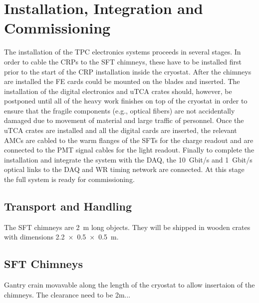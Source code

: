 
\section{Installation, Integration and Commissioning}
\label{sec:fddp-tpc-elec-install}

The installation of the TPC electronics systems proceeds in several stages. In order to cable the CRPs to the SFT chimneys, these have to be installed first prior to the start of the CRP installation inside the cryostat. After the chimneys are installed the FE cards could be mounted on the blades and inserted. The installation of the digital electronics and uTCA crates should, however, be postponed until all of the heavy work finishes on top of the cryostat in order to ensure that the fragile components (e.g., optical fibers) are not accidentally damaged due to movement of material and large traffic of personnel. Once the uTCA crates are installed and all the digital cards are inserted, the relevant AMCs are cabled to the warm flanges of the SFTs for the charge readout and are connected to the PMT signal cables for the light readout. Finally to complete the installation and integrate the system with the DAQ, the \SI{10}{Gbit/s} and \SI{1}{Gbit/s} optical links to the DAQ and WR timing network are connected. At this stage the full system is ready for commissioning. 

\subsection{Transport and Handling}
\label{sec:fddp-tpc-elec-install-transport}

The SFT chimneys are \SI{2}{\meter} long objects. They will be shipped in wooden crates with dimensions \SI[product-units=power]{2.2x0.5x0.5}{m}. 

\subsection{SFT Chimneys}
\label{sec:fddp-tpc-elec-install-sft}
Gantry crain movavable along the length of the cryostat to allow insertaion of the chimneys. The clearance need to be 2m...

